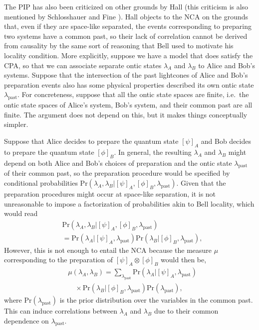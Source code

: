\documentclass[DIV=calc,fontsize=12pt]{scrartcl} %
\theoremstyle{definition}
\theoremstyle{plain}
\newcommand{\Proj}[1]{\ensuremath{\left [ #1 \right ]}}
\begin{document}
\label{CNCA}

The PIP has also been criticized on other grounds by Hall
\cite{Hall2011} (this criticism is also mentioned by Schlosshauer and
Fine \cite{Schlosshauer2012}).  Hall objects to the NCA on the grounds
that, even if they are space-like separated, the events corresponding
to preparing two systems have a common past, so their lack of
correlation cannot be derived from causality by the same sort of
reasoning that Bell used to motivate his locality condition.  More
explicitly, suppose we have a model that does satisfy the CPA, so that
we can associate separate ontic states $\lambda_A$ and $\lambda_B$ to
Alice and Bob's systems.  Suppose that the intersection of the past
lightcones of Alice and Bob's preparation events also has some
physical properties described its own ontic state
$\lambda_{\text{past}}$.  For concreteness, suppose that all the ontic
state spaces are finite, i.e.\ the ontic state spaces of Alice's
system, Bob's system, and their common past are all finite.  The
argument does not depend on this, but it makes things conceptually
simpler.

Suppose that Alice decides to prepare the quantum state
$\Proj{\psi}_A$ and Bob decides to prepare the quantum state
$\Proj{\phi}_B$.  In general, the resulting $\lambda_A$ and
$\lambda_B$ might depend on both Alice and Bob's choices of
preparation and the ontic state $\lambda_{\text{past}}$ of their
common past, so the preparation procedure would be specified by
conditional probabilities
$\text{Pr}(\lambda_A,\lambda_B|\Proj{\psi}_A,\Proj{\phi}_B,\lambda_{\text{past}})$.
Given that the preparation procedures might occur at space-like
separation, it is not unreasonable to impose a factorization of
probabilities akin to Bell locality, which would read
\begin{align}
&\text{Pr}(\lambda_A,\lambda_B|\Proj{\psi}_A,\Proj{\phi}_B,\lambda_{\text{past}})\nonumber\\
&= \text{Pr}(\lambda_A|\Proj{\psi}_A,\lambda_{\text{past}})
\text{Pr}(\lambda_B|\Proj{\phi}_B, \lambda_{\text{past}}),
\end{align}
However, this is not enough to entail the NCA because the measure
$\mu$ corresponding to the preparation of $\Proj{\psi}_A \otimes
\Proj{\phi}_B$ would then be,
\begin{align}
&\mu(\lambda_A,\lambda_B) = \sum_{\lambda_{\text{past}}}
\text{Pr}(\lambda_A|\Proj{\psi}_A, \lambda_{\text{past}})\nonumber\\
&\quad\times\text{Pr}(\lambda_B|\Proj{\phi}_B, \lambda_{\text{past}})
\text{Pr}(\lambda_{\text{past}}),
\end{align}
where $\text{Pr}(\lambda_{\text{past}})$ is the prior distribution
over the variables in the common past.  This can induce correlations
between $\lambda_A$ and $\lambda_B$ due to their common dependence on
$\lambda_{\text{past}}$.
\end{document}
